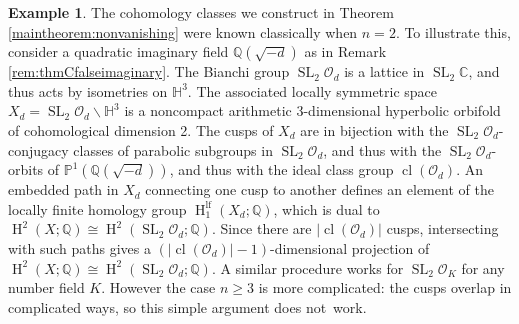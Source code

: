 \documentclass[11 pt]{article}
\theoremstyle{plain}
\theoremstyle{definition}
\newtheorem{example}[theorem]{Example}
\numberwithin{equation}{section}
\DeclareMathOperator{\SL}{SL}
\newcommand\HBolic{\ensuremath{\mathbb{H}}}
\newcommand\C{\ensuremath{\mathbb{C}}}
\newcommand\Q{\ensuremath{\mathbb{Q}}}
\DeclareMathOperator{\HH}{H}
\renewcommand{\O}{\mathcal{O}}
\DeclareMathOperator{\class}{cl}
\newcommand\abs[1]{\left\lvert#1\right\rvert}
\newcommand\iso{\cong}
\begin{document}
\begin{example}
\label{ex:hyperbolic3manifolds}
The cohomology classes we construct in Theorem \ref{maintheorem:nonvanishing} were known classically
when $n=2$.  To illustrate this, consider a quadratic imaginary field $\Q(\sqrt{-d})$ as in
Remark \ref{rem:thmCfalseimaginary}. The Bianchi group $\SL_2 \O_d$ is a lattice in $\SL_2 \C$,
and thus acts by isometries on $\HBolic^3$.  The associated
locally symmetric space $X_d = \SL_2 \O_d \backslash \HBolic^3$ is a noncompact arithmetic $3$-dimensional hyperbolic orbifold of cohomological dimension 2. The
cusps of $X_d$ are in bijection with the $\SL_2 \O_d$-conjugacy classes of parabolic subgroups in $\SL_2 \O_d$, and thus with the $\SL_2\O_d$-orbits of $\mathbb{P}^1(\Q(\sqrt{-d}))$, and thus with the ideal class group $\class(\O_d)$.
An embedded path in $X_d$ connecting one cusp to another defines an element of the locally
finite homology group $\HH_1^{\text{lf}}(X_d;\Q)$, which is dual to $\HH^2(X;\Q)\iso \HH^2(\SL_2 \O_d;\Q)$. Since there are 
$\abs{\class(\O_d)}$ cusps, intersecting with such paths gives a $(\abs{\class(\O_d)}-1)$-dimensional projection of $\HH^2(X;\Q)\iso \HH^2(\SL_2 \O_d;\Q)$.
A similar procedure works for $\SL_2 \O_K$ for any number field $K$. However the case $n \geq 3$ is more complicated:
the cusps overlap in complicated ways, so this simple argument does not~work.
\end{example}
\end{document}
